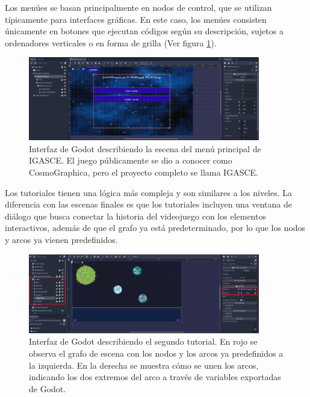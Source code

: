 Los menúes se basan principalmente en nodos de control, que se utilizan típicamente para interfaces gráficas. En este caso, los menúes consisten únicamente en botones que ejecutan códigos según su descripción, sujetos a ordenadores verticales o en forma de grilla (Ver figura \ref{GodotMenuInterface}).

\begin{figure}[h]
	\centering
	\includegraphics[width=0.9\textwidth]{imagenes/GodotInterfaceMainMenu.png}
	\caption{Interfaz de Godot describiendo la escena del menú principal de IGASCE. El juego públicamente se dio a conocer como CosmoGraphica, pero el proyecto completo se llama IGASCE.}
	\label{GodotMenuInterface}
\end{figure}


Los tutoriales tienen una lógica más compleja y son similares a los niveles. La diferencia con las escenas finales es que los tutoriales incluyen una ventana de diálogo que busca conectar la historia del videojuego con los elementos interactivos, además de que el grafo ya está predeterminado, por lo que los nodos y arcos ya vienen predefinidos.

\begin{figure}[h]
	\centering
	\includegraphics[width=0.9\textwidth]{imagenes/SecondTutorialGraph.png}
	\caption{Interfaz de Godot describiendo el segundo tutorial. En rojo se observa el grafo de escena con los nodos y los arcos ya predefinidos a la izquierda. En la derecha se muestra cómo se unen los arcos, indicando los dos extremos del arco a través de variables exportadas de Godot.}
	\label{SecondTutorialGraph}
\end{figure}


